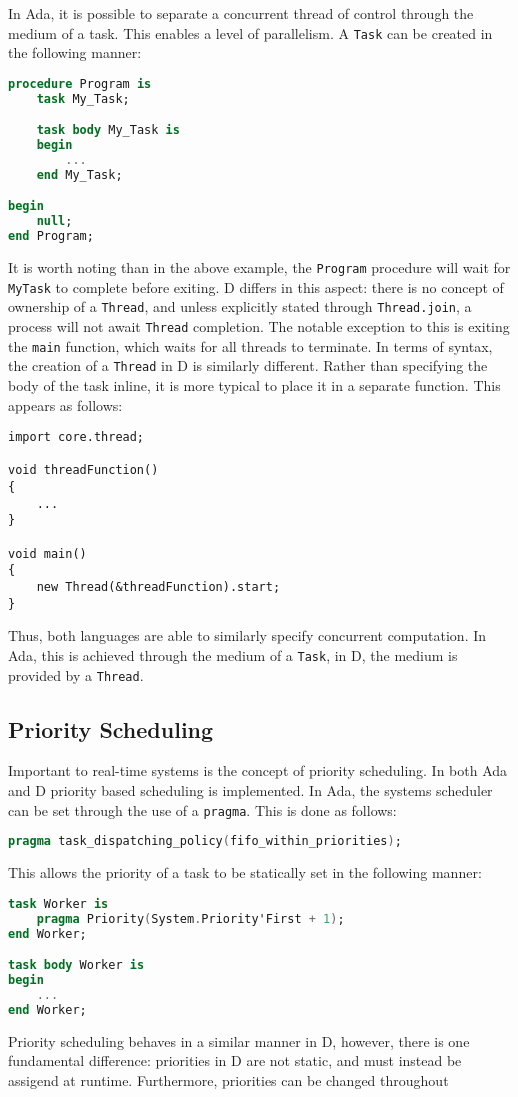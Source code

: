 In Ada, it is possible to separate a concurrent thread of control through the
medium of a task. This enables a level of parallelism. A \texttt{Task} can be 
created in the following manner: 
\begin{lstlisting}[language=Ada]
procedure Program is 
    task My_Task; 

    task body My_Task is 
    begin
        ...
    end My_Task;

begin
    null; 
end Program;
\end{lstlisting}
It is worth noting than in the above example, the \texttt{Program} procedure will wait
for \texttt{My\textunderscore{}Task} to complete before exiting. D differs in this aspect: 
there is no concept of ownership of a \texttt{Thread}, and unless
explicitly stated through \texttt{Thread.join}, a process will not await
\texttt{Thread} completion. The notable exception to this is exiting the
\texttt{main} function, which waits for all threads to terminate. 
In terms of syntax, the creation of a
\texttt{Thread} in D is similarly different. Rather than specifying the body of
the task inline, it is more typical to place it in a separate function. This
appears as follows: 
\begin{lstlisting}
import core.thread; 

void threadFunction()
{
    ...
}

void main()
{
    new Thread(&threadFunction).start;
}
\end{lstlisting}
Thus, both languages are able to similarly specify concurrent computation. In
Ada, this is achieved through the medium of a \texttt{Task}, in D, the medium
is provided by a \texttt{Thread}. 

\subsection{Priority Scheduling}
Important to real-time systems is the concept of priority scheduling. In both
Ada and D priority based scheduling is implemented. In Ada, the systems scheduler can
be set through the use of a \texttt{pragma}. This is done as follows: 
\begin{lstlisting}[language=Ada]
pragma task_dispatching_policy(fifo_within_priorities); 
\end{lstlisting}
This allows the priority of a task to be statically set in the following manner: 
\begin{lstlisting}[language=Ada]
task Worker is 
    pragma Priority(System.Priority'First + 1); 
end Worker;

task body Worker is 
begin 
    ...
end Worker; 
\end{lstlisting}
Priority scheduling behaves in a similar manner in D, however, there is one
fundamental difference: priorities in D are not static, and must instead be
assigend at runtime. Furthermore, priorities can be changed throughout 

